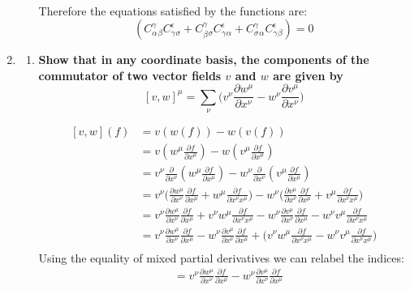 \documentclass[9pt]{report}
\begin{document}
\begin{enumerate}
\begin{enumerate}
\[\begin{align*}
    \end{align*}
  \]
  Therefore the equations satisfied by the functions are:
  \[
    (C^\gamma_\alpha_\beta C^\epsilon_\gamma_\sigma+ C^\gamma_\beta_\sigma C^\epsilon_\gamma_\alpha + C^\gamma_\sigma_\alpha C^\epsilon_\gamma_\beta) =0
  \]
  \end{enumerate}
  \item
  \begin{enumerate}
    \item \textbf{Show that in any coordinate basis, the components of the
      commutator of two vector fields $v$ and $w$ are given by}
      \[
        [v,w]^\mu = \sum_\nu \Big( v^\nu \frac{\partial w^\mu}{\partial x^\nu}
        - w^\nu\frac{\partial v^\mu}{\partial x^\nu} \Big)
      \]

      \[
  \begin{align}
    [v,w](f) &= v(w(f)) - w(v(f)) \\
   &= v(w^\mu\frac{\partial f}{\partial x^\mu})-w(v^\mu \frac{\partial f}{\partial x^\mu} )\\
   &= v^\nu \frac{\partial}{\partial x^\nu} (w^\mu\frac{\partial f}{\partial x^\mu})-
      w^\nu \frac{\partial}{\partial x^\nu} (v^\mu \frac{\partial f}{\partial x^\mu} )\\
   &= v^\nu \Big( \frac{\partial w^\mu}{\partial x^\nu}\frac{\partial f}{\partial x^\mu}
     + w^\mu \frac{\partial f}{\partial x^\nu x^\mu}\Big)-
     w^\nu \Big( \frac{\partial v^\mu}{\partial x^\nu}\frac{\partial f}{\partial x^\mu}
     + v^\mu \frac{\partial f}{\partial x^\nu x^\mu}\Big)\\
   &= v^\nu \frac{\partial w^\mu}{\partial x^\nu}\frac{\partial f}{\partial x^\mu}
     + v^\nu w^\mu \frac{\partial f}{\partial x^\nu x^\mu}
   - w^\nu \frac{\partial v^\mu}{\partial x^\nu}\frac{\partial f}{\partial x^\mu}
   - w^\nu v^\mu \frac{\partial f}{\partial x^\nu x^\mu}\\
   &= v^\nu \frac{\partial w^\mu}{\partial x^\nu}\frac{\partial f}{\partial x^\mu}
   - w^\nu \frac{\partial v^\mu}{\partial x^\nu}\frac{\partial f}{\partial x^\mu}
   + \Big(v^\nu w^\mu \frac{\partial f}{\partial x^\nu x^\mu}
   - w^\nu v^\mu \frac{\partial f}{\partial x^\nu x^\mu}\Big)\\
  \end{align}
      \]
  Using the equality of mixed partial derivatives we can relabel the indices:
  \[
  \begin{align}
   &= v^\nu \frac{\partial w^\mu}{\partial x^\nu}\frac{\partial f}{\partial x^\mu}
   - w^\nu \frac{\partial v^\mu}{\partial x^\nu}\frac{\partial f}{\partial x^\mu}

\end{align}\]
\end{enumerate}
\end{enumerate}
\end{document}
